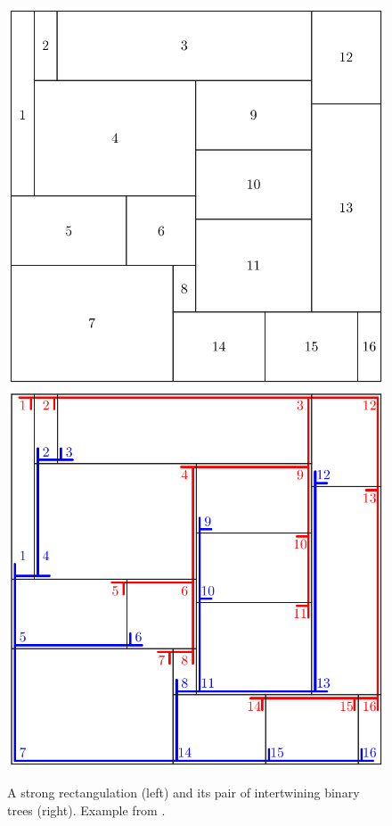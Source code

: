\documentclass{amsart}
\theoremstyle{definition}
\begin{document}
\begin{figure}
	\centerline{\includegraphics[scale=.7]{strongRectangulation} \qquad \includegraphics[scale=.7]{strongRectangulationTrees}}
	\caption{\label{fig:sourceTargetTrees}A strong rectangulation (left) and its pair of intertwining binary trees (right). Example from \cite{AsinowskiCardinalFelsnerFusy}.}
\end{figure}
\end{document}
